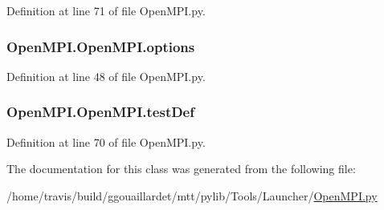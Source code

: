 Definition at line 71 of file Open\-M\-P\-I.\-py.

\hypertarget{classOpenMPI_1_1OpenMPI_a4a263774614f0b83a63a26639b46b2f5}{
\subsubsection[{options}]{\setlength{\rightskip}{0pt plus 5cm}Open\-M\-P\-I.\-Open\-M\-P\-I.\-options}}\label{classOpenMPI_1_1OpenMPI_a4a263774614f0b83a63a26639b46b2f5}


Definition at line 48 of file Open\-M\-P\-I.\-py.

\hypertarget{classOpenMPI_1_1OpenMPI_acd20b78013350c2363484589ef85b67c}{
\subsubsection[{test\-Def}]{\setlength{\rightskip}{0pt plus 5cm}Open\-M\-P\-I.\-Open\-M\-P\-I.\-test\-Def}}\label{classOpenMPI_1_1OpenMPI_acd20b78013350c2363484589ef85b67c}


Definition at line 70 of file Open\-M\-P\-I.\-py.



The documentation for this class was generated from the following file\-:\begin{DoxyCompactItemize}
\item 
/home/travis/build/ggouaillardet/mtt/pylib/\-Tools/\-Launcher/\hyperlink{OpenMPI_8py}{Open\-M\-P\-I.\-py}\end{DoxyCompactItemize}
